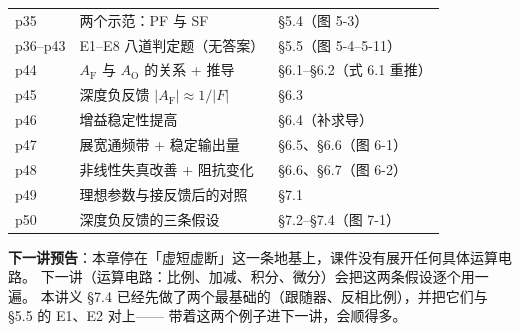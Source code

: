 \documentclass[11pt]{ctexart}
\begin{document}
\begin{center}
\begin{tabular}{@{}p{2.6cm}p{10.2cm}p{3.5cm}@{}}
\\
p35 & 两个示范：PF 与 SF & §5.4（图 5-3）
\\
p36--p43 & E1--E8 八道判定题（无答案） & §5.5（图 5-4--5-11）
\\
p44 & $A_{\mathrm{F}}$ 与 $A_{\mathrm{O}}$ 的关系 + 推导 & §6.1--§6.2（式 6.1 重推）
\\
p45 & 深度负反馈 $|A_{\mathrm{F}}|\approx1/|F|$ & §6.3
\\
p46 & 增益稳定性提高 & §6.4（补求导）
\\
p47 & 展宽通频带 + 稳定输出量 & §6.5、§6.6（图 6-1）
\\
p48 & 非线性失真改善 + 阻抗变化 & §6.6、§6.7（图 6-2）
\\
p49 & 理想参数与接反馈后的对照 & §7.1
\\
p50 & 深度负反馈的三条假设 & §7.2--§7.4（图 7-1）
\\
\bottomrule
\end{tabular}
\end{center}

\flowerrule

\begin{cbox}
\textbf{下一讲预告}：本章停在「虚短虚断」这一条地基上，课件没有展开任何具体运算电路。
下一讲（运算电路：比例、加减、积分、微分）会把这两条假设逐个用一遍。
本讲义 §7.4 已经先做了两个最基础的（跟随器、反相比例），并把它们与 §5.5 的 E1、E2 对上——
带着这两个例子进下一讲，会顺得多。
\end{cbox}
\end{document}
